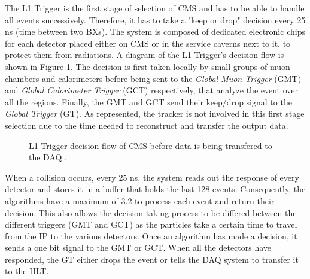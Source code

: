     			The L1 Trigger is the first stage of selection of CMS and has to be able to handle all events successively. Therefore, it has to take a "keep or drop" decision every 25 ns (time between two BXs). The system is composed of dedicated electronic chips for each detector placed either on CMS or in the service caverns next to it, to protect them from radiations. A diagram of the L1 Trigger's decision flow is shown in Figure \ref{fig:trigger_system_and_reconstruction_algorithms__l1}. The decision is first taken locally by small groups of muon chambers and calorimeters before being sent to the \emph{Global Muon Trigger} (GMT) \Cite{Trigger_Muon} and \emph{Global Calorimeter Trigger} (GCT) respectively, that analyze the event over all the regions. Finally, the GMT and GCT send their keep/drop signal to the \emph{Global Trigger} (GT). As represented, the tracker is not involved in this first stage selection due to the time needed to reconstruct and transfer the output data. \\

    			\begin{figure}[h!]
    				\centering
    				\caption{L1 Trigger decision flow of CMS before data is being transfered to the DAQ \Cite{CMS_at_LHC}.}
    				\label{fig:trigger_system_and_reconstruction_algorithms__l1}
    			\end{figure}

    			When a collision occurs, every 25 ns, the system reads out the response of every detector and stores it in a buffer that holds the last 128 events. Consequently, the algorithms have a maximum of 3.2 \us{} to process each event and return their decision. This also allows the decision taking process to be differed between the different triggers (GMT and GCT) as the particles take a certain time to travel from the IP to the various detectors. Once an algorithm has made a decision, it sends a one bit signal to the GMT or GCT. When all the detectors have responded, the GT either drops the event or tells the DAQ system to transfer it to the HLT. \\


